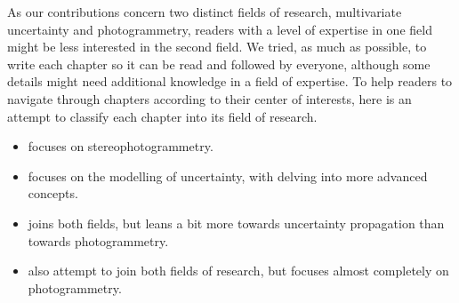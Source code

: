 As our contributions concern two distinct fields of research, multivariate uncertainty and photogrammetry, readers with a level of expertise in one field might be less interested in the second field. We tried, as much as possible, to write each chapter so it can be read and followed by everyone, although some details might need additional knowledge in a field of expertise. To help readers to navigate through chapters according to their center of interests, here is an attempt to classify each chapter into its field of research.
\begin{itemize}
    \item {} focuses on stereophotogrammetry.
    \item {} focuses on the modelling of uncertainty, with  delving into more advanced concepts.
    \item {} joins both fields, but leans a bit more towards uncertainty propagation than towards photogrammetry. 
    \item {} also attempt to join both fields of research, but focuses almost completely on photogrammetry.
\end{itemize}


